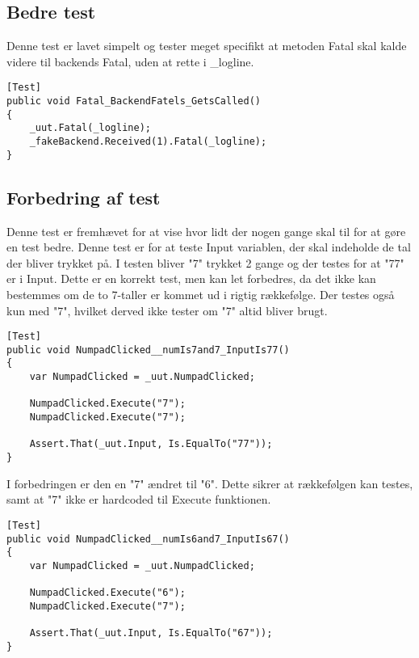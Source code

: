 \subsection{Bedre test}
Denne test er lavet simpelt og tester meget specifikt at metoden Fatal skal kalde videre til backends Fatal, uden at rette i \_logline.

\begin{lstlisting}
[Test]
public void Fatal_BackendFatels_GetsCalled()
{
    _uut.Fatal(_logline);
    _fakeBackend.Received(1).Fatal(_logline);
}
\end{lstlisting}


\subsection{Forbedring af test}
Denne test er fremhævet for at vise hvor lidt der nogen gange skal til for at gøre en test bedre. Denne test er for at teste Input variablen, der skal indeholde de tal der bliver trykket på. I testen bliver "7" trykket 2 gange og der testes for at "77" er i Input. Dette er en korrekt test, men kan let forbedres, da det ikke kan bestemmes om de to 7-taller er kommet ud i rigtig rækkefølge. Der testes også kun med "7", hvilket derved ikke tester om "7" altid bliver brugt.
\begin{lstlisting}
[Test]
public void NumpadClicked__numIs7and7_InputIs77()
{
    var NumpadClicked = _uut.NumpadClicked;

    NumpadClicked.Execute("7");
    NumpadClicked.Execute("7");

    Assert.That(_uut.Input, Is.EqualTo("77"));
}
\end{lstlisting}


I forbedringen er den en "7" ændret til "6". Dette sikrer at rækkefølgen kan testes, samt at "7" ikke er hardcoded til Execute funktionen.
\begin{lstlisting}
[Test]
public void NumpadClicked__numIs6and7_InputIs67()
{
    var NumpadClicked = _uut.NumpadClicked;

    NumpadClicked.Execute("6");
    NumpadClicked.Execute("7");

    Assert.That(_uut.Input, Is.EqualTo("67"));
}
\end{lstlisting}

